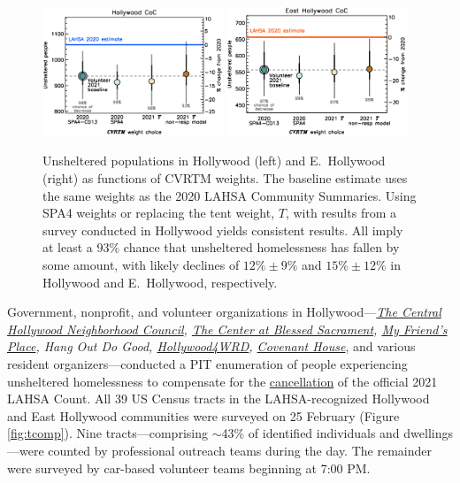 \documentclass[11pt]{article}
\def\resp{respectively}
\begin{document}
\begin{figure}[h!]
	\centering
	\includegraphics[width = 0.48\textwidth, trim = 0cm 0.5cm 0cm 1cm]{hwoodFinal}
	\includegraphics[width = 0.48\textwidth, trim = 0cm 0.5cm 0cm 1cm]{ehoFinal}	
	\caption{Unsheltered populations in Hollywood (left) and E.~Hollywood (right) 
			as functions of CVRTM weights. The baseline estimate uses the same weights as the 
			2020 LAHSA Community Summaries. Using SPA4 weights or replacing the tent 
			weight, $T$, with results from a survey conducted in Hollywood yields consistent
			results. All imply at least a 93\% chance that unsheltered homelessness has fallen
			by some amount, with likely declines of $12\%\pm9\%$ and $15\%\pm12\%$
			in Hollywood and E.~Hollywood, \resp.}
	\label{fig:wtComp}
\end{figure}

 Government, nonprofit, and volunteer organizations in Hollywood---{\it \href{https://chnc.org}
{The Central Hollywood Neighborhood Council}, \href{https://thecenterinhollywood.org}{The Center
at Blessed Sacrament}, \href{https://www.myfriendsplace.org/}{My Friend's Place}, Hang Out Do Good, \href{https://hollywood4wrd.live}
{Hollywood4WRD}, \href{https://www.covenanthouse.org/spring-meal-match?sourceid=2483460&origin=DHQEI2109EZI0N&utm_source=2103marchmealmatchweb&utm_medium=cpc&utm_campaign=FY21MarchMealMatch&utm_content=bsd2103marchmealmatchweb&gclid=CjwKCAiAp4KCBhB6EiwAxRxbpJA2yM7lM2tyAqjVALZgBGvjnhobCJJ0XmuELFDXzM5xxZ0BqyX1ChoCLi0QAvD_BwE}{Covenant House}}, and various resident organizers---conducted 
a PIT enumeration of people experiencing unsheltered homelessness to compensate for 
the \href{https://laist.com/latest/post/20201209/LAHSA-cancels-2021-homeless-count-los-angeles-covid-19}
{cancellation} of the official 2021 LAHSA Count. All 39 US Census tracts in the LAHSA-recognized Hollywood 
and East Hollywood communities were surveyed on 25 February (Figure \ref{fig:tcomp}). Nine tracts---comprising 
$\sim$43\% of identified individuals and dwellings---were counted by professional outreach teams during the 
day. The remainder were surveyed by car-based volunteer teams beginning at 7:00 PM.
\end{document}
